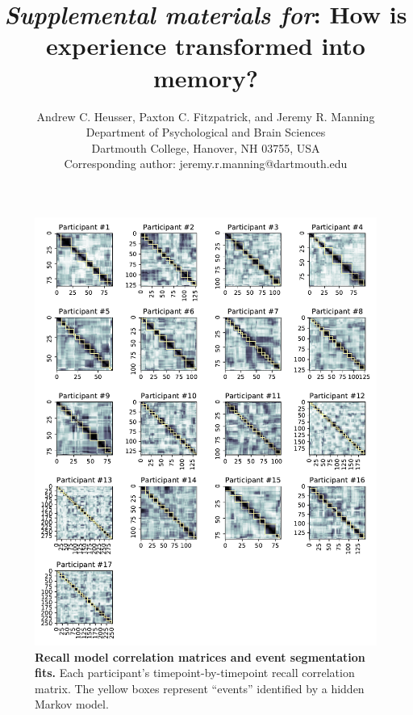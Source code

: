 \documentclass{article}
\title{\textit{Supplemental materials for}: How is experience transformed into memory?}
\author{Andrew C. Heusser, Paxton C. Fitzpatrick, and Jeremy R. Manning\\Department of Psychological and Brain Sciences\\Dartmouth College, Hanover, NH 03755, USA\\Corresponding author: jeremy.r.manning@dartmouth.edu}
\begin{document}
\maketitle

\setcounter{equation}{0}
\setcounter{figure}{0}
\setcounter{table}{0}
\setcounter{page}{1}
\setcounter{section}{0}
\makeatletter
\renewcommand{\theequation}{S\arabic{equation}}
\renewcommand{\thefigure}{S\arabic{figure}}
\renewcommand{\bibnumfmt}[1]{[S#1]}
\renewcommand{\citenumfont}[1]{S#1}

\begin{figure}[tp]
\centering
\includegraphics[width=1\textwidth]{figs/supp1_corrmats.pdf}
\caption{\small \textbf{Recall model correlation matrices and event segmentation fits.} Each participant's timepoint-by-timepoint recall correlation matrix.  The yellow boxes represent ``events'' identified by a hidden Markov model.}
\label{fig:corrmats}
\end{figure}
\end{document}
